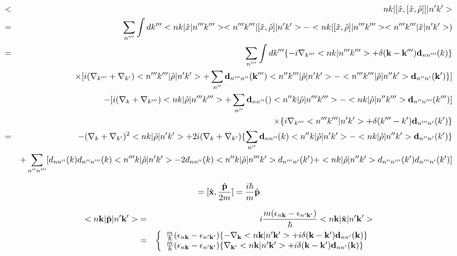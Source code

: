 \documentclass[aps,prb,preprint]{revtex4-1}
\begin{document}
\begin{appendix}
\begin{eqnarray}
<&&nk|[\hat{x}, [\hat{x},\hat{\rho}]]|n'k'> \nonumber \\
=&& \sum_{n'''} \int dk''' <nk|\hat{x}|n'''k'''><n'''k'''|[\hat{x},\hat{\rho}]|n'k'>  - <nk| [\hat{x},\hat{\rho}]|n'''k'''><n'''k'''|\hat{x}|n'k'>) \nonumber \\
=&& \sum_{n'''} \int dk''' \{ -i \nabla_{k'''} <nk|n'''k'''> + \delta({\bf k-k'''}) {\bf d}_{nn'''}({k})\} \nonumber \\ 
&& \times [ i (\nabla_{k'''} + \nabla_{k'}) <n'''k'''|\hat{\rho}|n'k'> + \sum_{n''} {\bf d}_{n'''n''}({\bf k'''}) <n''k'''|\hat{\rho}|n'k'> - <n'''k'''|\hat{\rho}|n''k'> {\bf d}_{n''n'}({\bf k'})\} ]\nonumber \\
 && - [ i (\nabla_{k} + \nabla_{k'''}) <nk|\hat{\rho}|n'''k'''> + \sum_{n''} {\bf d}_{nn''}() <n''k|\hat{\rho}|n'''k'''> - <nk|\hat{\rho}|n''k'''> {\bf d}_{n''n'''}(k''') ]\nonumber \\
 && \times \{ i \nabla_{k'''} <n'''k'''|n'k'> + \delta(k'''-k') {\bf d}_{n'''n'}(k')\} \nonumber \\
 =&& - (\nabla_{k} + \nabla_{k'})^2 <nk|\hat{\rho}|n'k'> + 2i(\nabla_{k} + \nabla_{k'})\{ \sum_{n''} {\bf d}_{nn''}({k}) <n''k|\hat{\rho}|n'k'> - <nk|\hat{\rho}|n''k'> {\bf d}_{n''n'}({k'})\} \nonumber \\
 && +\sum_{n''n'''} [ d_{nn''}(k) d_{n''n'''}(k) <n'''k|\hat{\rho}|n'k'> - 2 d_{nn''}(k) <n''k|\hat{\rho}|n'''k'> d_{n'''n'}(k') + <nk|\hat{\rho}|n''k'> d_{n''n'''}(k') d_{n'''n'}(k')]\nonumber \\
\end{eqnarray} 


\begin{eqnarray}
[\hat{\bf x}, \hat{H}_0] = [\hat{\bf x}, \frac{\hat{\bf p}}{2m}]  =\frac{i \hbar}{m}\hat{\bf p}
\end{eqnarray} 

\begin{eqnarray}
<n{\bf k}|\hat{\bf p}|n'{\bf k'}> &=&i \frac{m(\epsilon_{n{\bf k}}-\epsilon_{n'{\bf k'}})}{\hbar} <n{\bf k}|\hat{\bf x}|n'{\bf k'}> \nonumber \\
&=&\left\{
\begin{array}{l}
\frac{m}{\hbar}(\epsilon_{n{\bf k}}-\epsilon_{n'{\bf k'}})\{-\nabla_{\bf k} <n{\bf k}|n'{\bf k'}> + i \delta({\bf k-k'}) {\bf d}_{nn'}({\bf k})\}  \\
\frac{m}{\hbar}(\epsilon_{n{\bf k}}-\epsilon_{n'{\bf k'}})\{\nabla_{\bf k'} <n{\bf k}|n'{\bf k'}> + i \delta({\bf k-k'}) {\bf d}_{nn'}({\bf k})\} 
\end{array}
\right.
\end{eqnarray} 


\end{appendix}
\end{document}
